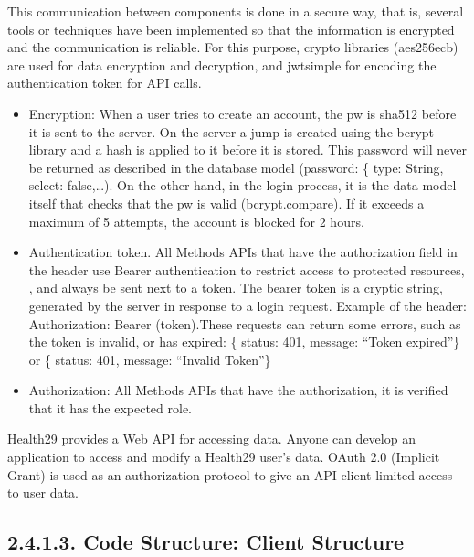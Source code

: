 \documentclass[letterpaper,10pt,english]{sphinxmanual}
\begin{document}
This communication between components is done in a secure way, that is, several tools or techniques have been implemented so that the information is encrypted and the communication is reliable.
For this purpose, crypto libraries (aes\sphinxhyphen{}256\sphinxhyphen{}ecb) are used for data encryption and decryption, and jwt\sphinxhyphen{}simple for encoding the authentication token for API calls.
\begin{itemize}
\item {} 
Encryption: When a user tries to create an account, the pw is sha512 before it is sent to the server. On the server a jump is created using the bcrypt library and a hash is applied to it before it is stored. This password will never be returned as described in the database model (password: \{ type: String, select: false,…). On the other hand, in the login process, it is the data model itself that checks that the pw is valid (bcrypt.compare). If it exceeds a maximum of 5 attempts, the account is blocked for 2 hours.

\item {} 
Authentication token. All Methods APIs that have the authorization field in the header use Bearer authentication to restrict access to protected resources, , and always be sent next to a token. The bearer token is a cryptic string, generated by the server in response to a login request. Example of the header: Authorization: Bearer (token).These requests can return some errors, such as the token is invalid, or has expired: \{ status: 401, message: “Token expired”\} or \{ status: 401, message: “Invalid Token”\}

\item {} 
Authorization: All Methods APIs that have the authorization, it is verified that it has the expected role.

\end{itemize}

Health29 provides a Web API for accessing data. Anyone can develop an application to access and modify a Health29 user’s data. OAuth 2.0 (Implicit Grant) is used as an authorization protocol to give an API client limited access to user data.


\subsection{2.4.1.3. Code Structure: Client Structure}
\label{\detokenize{pages/SW/Code:code-structure-client-structure}}
\end{document}
